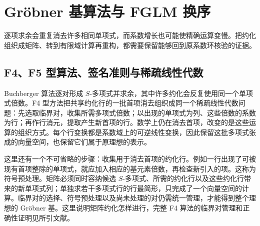 
\section{Gröbner 基算法与 FGLM 换序}
\label{b3:sec:B02}

逐项求余会重复消去许多相同单项式，而系数增长也可能使精确运算变慢。把约化组织成矩阵、转到有限域计算再重构，都需要保留能够回到原系数环核验的证据。

%
%
%


\subsection{F4、F5 型算法、签名准则与稀疏线性代数}
\label{b3:subsec:B02:01}

Buchberger 算法逐对形成 \(S\)-多项式并求余，其中许多约化会反复使用同一个单项式倍数。F4 型方法\cite{Faugere1999F4}把共享约化行的一批首项消去组织成同一个稀疏线性代数问题：先选取临界对，收集所需多项式倍数；以出现的单项式为列、这些倍数的系数为行；再作行消元，提取产生新首项的行。数学上仍在消去首项，改变的是这些运算的组织方式。每个行变换都是系数域上的可逆线性变换，因此保留这批多项式张成的向量空间，也保留它们属于原理想的表示。

\ProseParagraphBreak
这里还有一个不可省略的步骤：收集用于消去首项的约化行。例如一行出现了可被现有首项整除的单项式，就应加入相应的基元素倍数，再检查新引入的项。这称为符号预处理。矩阵必须同时容纳候选 \(S\)-多项式、所需的约化行以及这些约化行带来的新单项式列；单独求若干多项式行的行最简形，只完成了一个向量空间的计算。临界对的选择、符号预处理以及尚未处理的对仍需统一管理，才能得到整个理想的 Gröbner 基。这里说明矩阵约化怎样进行，完整 F4 算法的临界对管理和正确性证明见所引文献。

